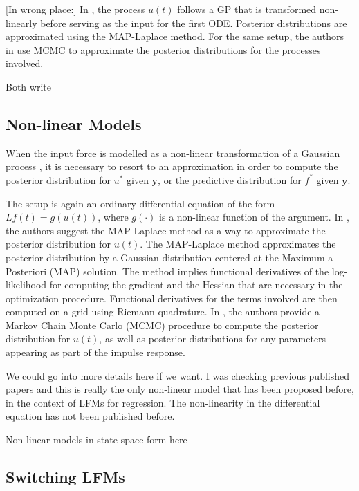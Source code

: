 \documentclass[journal]{IEEEtran}
\newcommand{\mauricio}[1]{{\color{blue}#1}}
\newcommand{\simo}[1]{{\color{red}#1}}
\begin{document}
\simo{[In wrong place:] In \cite{Gao:latent08}, the process $u(t)$ follows
a GP that is transformed non-linearly before serving as the input for the first ODE. Posterior distributions are
approximated using the MAP-Laplace method. For the same setup, the authors in \cite{Titsias:BMC:2012} use MCMC to
approximate the posterior distributions for the processes involved.}


\simo{Both write}

\subsection{Non-linear Models}

When the input force is modelled as a non-linear transformation of a Gaussian process \cite{Lawrence:gpsim2007a,
Gao:latent08, Titsias:BMC:2012}, it is necessary to resort to an approximation in order to compute the posterior
distribution for $u^*$ given $\mathbf{y}$, or the predictive distribution for $f^*$ given $\mathbf{y}$.

The setup is again an ordinary differential equation of the form $Lf(t)=g(u(t))$, where $g(\cdot)$ is a non-linear function
of the argument. In \cite{Lawrence:gpsim2007a, Gao:latent08}, the authors suggest the MAP-Laplace method
\cite{Bishop:PRML06} as a way to approximate the posterior distribution for $u(t)$. The MAP-Laplace method approximates
the posterior distribution by a
Gaussian distribution centered at the Maximum a Posteriori (MAP) solution. The method implies functional derivatives of the
log-likelihood for computing the gradient and the Hessian that are necessary in the optimization procedure. Functional
derivatives for the terms involved are then computed on a grid using Riemann quadrature. In \cite{Titsias:BMC:2012}, the
authors provide a Markov Chain Monte Carlo (MCMC) procedure to compute the posterior distribution for $u(t)$, as well
as posterior distributions for any parameters appearing as part of the impulse response.

\mauricio{We could go into more details here if we want. I was checking previous published papers and this is really
the only non-linear model that has been proposed before, in the context of LFMs for regression. The non-linearity in the
differential equation has not been published before}.


\simo{Non-linear models in state-space form here}


\subsection{Switching LFMs}
\end{document}
